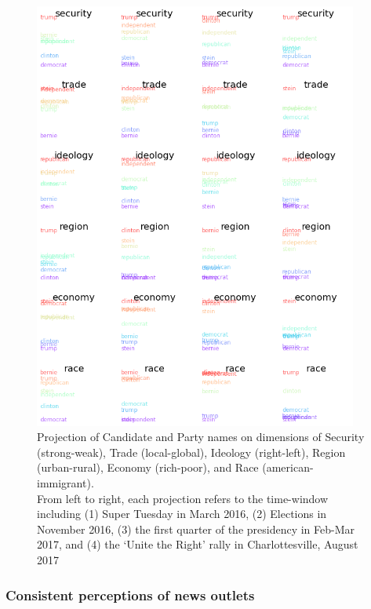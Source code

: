 \begin{figure}[h]%
    \centering

    \includegraphics[width=0.95\textwidth]{figures/proj-candi.png}

    \caption{Projection of Candidate and Party names on dimensions of Security (strong-weak), Trade (local-global), Ideology (right-left), Region (urban-rural), Economy (rich-poor), and Race (american-immigrant). \\ From left to right, each projection refers to the time-window including (1) Super Tuesday in March 2016, (2) Elections in November 2016, (3) the first quarter of the presidency in Feb-Mar 2017, and (4) the `Unite the Right' rally in Charlottesville, August 2017}%

    \label{fig:proj_parties}%

\end{figure}

\subsubsection*{Consistent perceptions of news outlets}

